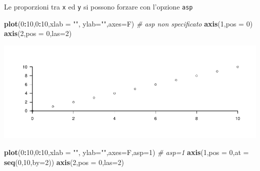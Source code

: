 \documentclass[
  11pt,
]{book}
\newenvironment{Shaded}{\begin{snugshade}}{\end{snugshade}}
\newcommand{\AttributeTok}[1]{\textcolor[rgb]{0.13,0.29,0.53}{#1}}
\newcommand{\CommentTok}[1]{\textcolor[rgb]{0.56,0.35,0.01}{\textit{#1}}}
\newcommand{\DecValTok}[1]{\textcolor[rgb]{0.00,0.00,0.81}{#1}}
\newcommand{\FunctionTok}[1]{\textcolor[rgb]{0.13,0.29,0.53}{\textbf{#1}}}
\newcommand{\NormalTok}[1]{#1}
\newcommand{\SpecialCharTok}[1]{\textcolor[rgb]{0.81,0.36,0.00}{\textbf{#1}}}
\newcommand{\StringTok}[1]{\textcolor[rgb]{0.31,0.60,0.02}{#1}}
\theoremstyle{mytheoremstyle}
\theoremstyle{mydefstyle}
\begin{document}
Le proporzioni tra \texttt{x} ed \texttt{y} si possono forzare con l'opzione \texttt{asp}

\begin{Shaded}
\begin{Highlighting}[]
\FunctionTok{plot}\NormalTok{(}\DecValTok{0}\SpecialCharTok{:}\DecValTok{10}\NormalTok{,}\DecValTok{0}\SpecialCharTok{:}\DecValTok{10}\NormalTok{,}\AttributeTok{xlab =} \StringTok{""}\NormalTok{, }\AttributeTok{ylab=}\StringTok{""}\NormalTok{,}\AttributeTok{axes=}\NormalTok{F) }\CommentTok{\# asp non specificato}
\FunctionTok{axis}\NormalTok{(}\DecValTok{1}\NormalTok{,}\AttributeTok{pos =} \DecValTok{0}\NormalTok{)}
\FunctionTok{axis}\NormalTok{(}\DecValTok{2}\NormalTok{,}\AttributeTok{pos =} \DecValTok{0}\NormalTok{,}\AttributeTok{las=}\DecValTok{2}\NormalTok{)}
\end{Highlighting}
\end{Shaded}

\begin{center}\includegraphics{Appunti_di_Statistica_2025_files/figure-latex/24-Libro-30,-1} \end{center}

\begin{Shaded}
\begin{Highlighting}[]
\FunctionTok{plot}\NormalTok{(}\DecValTok{0}\SpecialCharTok{:}\DecValTok{10}\NormalTok{,}\DecValTok{0}\SpecialCharTok{:}\DecValTok{10}\NormalTok{,}\AttributeTok{xlab =} \StringTok{""}\NormalTok{, }\AttributeTok{ylab=}\StringTok{""}\NormalTok{,}\AttributeTok{axes=}\NormalTok{F,}\AttributeTok{asp=}\DecValTok{1}\NormalTok{) }\CommentTok{\# asp=1 }
\FunctionTok{axis}\NormalTok{(}\DecValTok{1}\NormalTok{,}\AttributeTok{pos =} \DecValTok{0}\NormalTok{,}\AttributeTok{at =} \FunctionTok{seq}\NormalTok{(}\DecValTok{0}\NormalTok{,}\DecValTok{10}\NormalTok{,}\AttributeTok{by=}\DecValTok{2}\NormalTok{))}
\FunctionTok{axis}\NormalTok{(}\DecValTok{2}\NormalTok{,}\AttributeTok{pos =} \DecValTok{0}\NormalTok{,}\AttributeTok{las=}\DecValTok{2}\NormalTok{)}
\end{Highlighting}
\end{Shaded}
\end{document}

